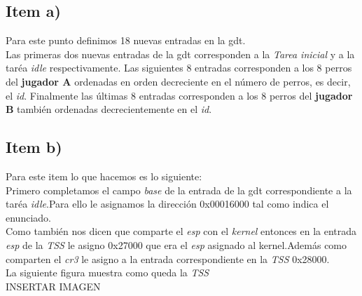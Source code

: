 \subsection{Item a)}
Para este punto definimos 18 nuevas entradas en la gdt.\\
Las primeras dos nuevas entradas de la gdt corresponden a la \textit{Tarea inicial} y a la taréa \textit{idle} respectivamente. Las siguientes 8 entradas corresponden a los 8 perros del \textbf{jugador A} ordenadas en orden decreciente en el número de perros, es decir, el \textit{id}. Finalmente las últimas 8 entradas corresponden a los 8 perros del \textbf{jugador B} también ordenadas decrecientemente en el \textit{id}.\\

\subsection{Item b)}
Para este item lo que hacemos es lo siguiente:\\
Primero completamos el campo \textit{base} de la entrada de la gdt correspondiente a la taréa \textit{idle}.Para ello le asignamos la dirección 0x00016000 tal como indica el enunciado.\\
Como también nos dicen que comparte el \textit{esp} con el \textit{kernel} entonces en la entrada \textit{esp} de la \textit{TSS} le asigno 0x27000 que era el \textit{esp} asignado al kernel.Además como comparten el \textit{cr3} le asigno a la entrada correspondiente en la \textit{TSS} 0x28000.\\%
La siguiente figura muestra como queda la \textit{TSS}\\


INSERTAR IMAGEN


